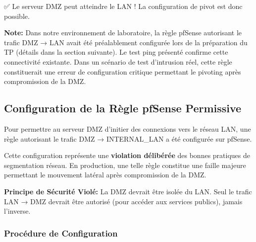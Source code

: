 \documentclass[12pt,a4paper,openany]{report}
\begin{document}
	✅ Le serveur DMZ peut atteindre le LAN ! La configuration de pivot est donc possible.
	
	\textbf{Note:} Dans notre environnement de laboratoire, la règle pfSense 
	autorisant le trafic DMZ → LAN avait été préalablement configurée lors 
	de la préparation du TP (détails dans la section suivante). Le test ping 
	présenté confirme cette connectivité existante. Dans un scénario de test 
	d'intrusion réel, cette règle constituerait une erreur de configuration 
	critique permettant le pivoting après compromission de la DMZ.
	
	
	\subsection{Configuration de la Règle pfSense Permissive}
	
	Pour permettre au serveur DMZ d'initier des connexions vers le réseau LAN, 
	une règle autorisant le trafic DMZ → INTERNAL\_LAN a été configurée sur pfSense. 
	
	\begin{tcolorbox}[colback=accent!5!white, colframe=accent, 
		title=\textbf{⚠️ ERREUR DE CONFIGURATION SIMULÉE}]
		
		Cette configuration représente une \textbf{violation délibérée} des bonnes 
		pratiques de segmentation réseau. En production, une telle règle constitue 
		une faille majeure permettant le mouvement latéral après compromission de la DMZ.
		
		\textbf{Principe de Sécurité Violé:} La DMZ devrait être isolée du LAN. 
		Seul le trafic LAN → DMZ devrait être autorisé (pour accéder aux services 
		publics), jamais l'inverse.
		
	\end{tcolorbox}
	
	\subsubsection{Procédure de Configuration}
	
\end{document}
